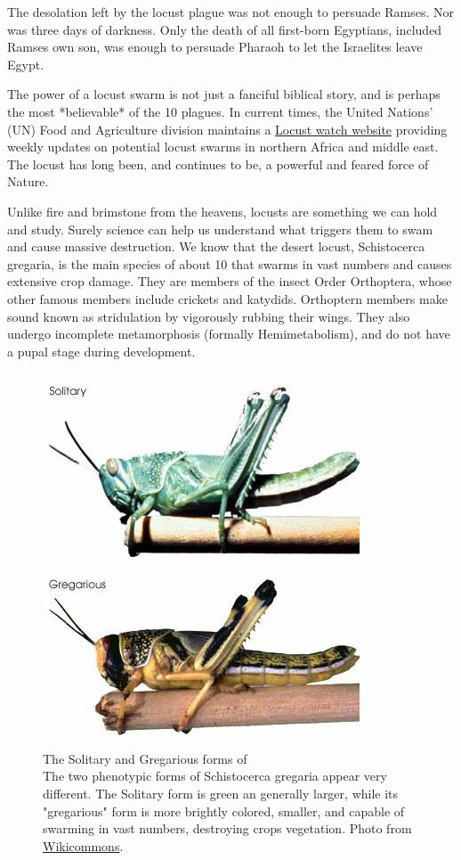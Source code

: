 The desolation left by the locust plague was not enough to persuade Ramses. Nor was three days of darkness. Only the death of all first-born Egyptians, included Ramses own son, was enough to persuade Pharaoh to let the Israelites leave Egypt.

The power of a locust swarm is not just a fanciful biblical story, and is perhaps the most *believable* of the 10 plagues. In current times, the United Nations' (UN) Food and Agriculture division maintains a \href{http://www.fao.org/ag/locusts/en/info/info/news/index.html}{Locust watch website} providing weekly updates on potential locust swarms in northern Africa and middle east. The locust has long been, and continues to be, a powerful and feared force of Nature.

Unlike fire and brimstone from the heavens, locusts are something we can hold and study. Surely science can help us understand what triggers them to swam and cause massive destruction. We know that the desert locust, Schistocerca gregaria, is the main species of about 10 that swarms in vast numbers and causes extensive crop damage. They are members of the insect Order Orthoptera, whose other famous members include crickets and katydids. Orthoptern members make sound known as stridulation by vigorously rubbing their wings. They also undergo incomplete metamorphosis (formally Hemimetabolism), and do not have a pupal stage during development. 

\begin{figure}[htbp]
	\centering 
	\includegraphics{Figures/DesertLocust.jpeg}
	\caption[The Solitary and Gregarious forms of \locusts{}]
	{
		The Solitary and Gregarious forms of \locusts{}\\[0.25cm]
		The two phenotypic forms of Schistocerca gregaria appear very different.  The Solitary form is green an generally larger, while its "gregarious" form is more brightly colored, smaller, and capable of swarming in vast numbers, destroying crops vegetation. Photo from \href{http://www.wikicommons.com}{Wikicommons}.
	}
	\label{fig:Locust}
\end{figure}


